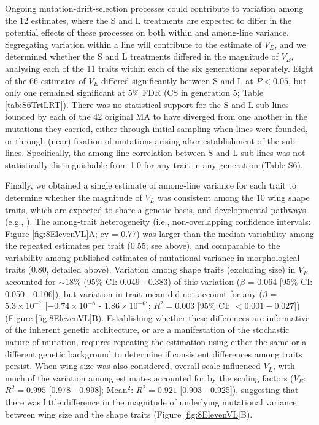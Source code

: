 Ongoing mutation-drift-selection processes could contribute to variation among the 12 estimates, where the S and L treatments are expected to differ in the potential effects of these processes on both within and among-line variance. Segregating variation within a line will contribute to the estimate of $V_E$, and we determined whether the S and L treatments differed in the magnitude of $V_E$, analysing each of the 11 traits within each of the six generations separately. Eight of the 66 estimates of $V_E$ differed significantly between S and L at $P < 0.05$, but only one remained significant at 5\% FDR (CS in generation 5; Table \ref{tab:S6TrtLRT}). There was no statistical support for the S and L sub-lines founded by each of the 42 original MA to have diverged from one another in the mutations they carried, either through initial sampling when lines were founded, or through (near) fixation of mutations arising after establishment of the sub-lines. Specifically, the among-line correlation between S and L sub-lines was not statistically distinguishable from 1.0 for any trait in any generation (Table S6). \par

Finally, we obtained a single estimate of among-line variance for each trait to determine whether the magnitude of $V_L$ was consistent among the 10 wing shape traits, which are expected to share a genetic basis, and developmental pathways (e.g., \citealp{Meze05,Neto09}). The among-trait heterogeneity (i.e., non-overlapping confidence intervals: Figure \ref{fig:8ElevenVL}A; cv = 0.77) was larger than the median variability among the repeated estimates per trait (0.55; see above), and comparable to the variability among published estimates of mutational variance in morphological traits (0.80, detailed above). Variation among shape traits (excluding size) in $V_E$ accounted for $\sim18\%$ (95\% CI: 0.049 - 0.383) of this variation ($\beta$ = 0.064 [95\% CI: 0.050 - 0.106]), but variation in trait mean did not account for any ($\beta$ = $5.3 \times 10^{-7}$ [$-0.74 \times 10^{-8}$ - $1.86 \times 10^{-6}$]; $R^2 = 0.003$ [95\% CI: $<0.001 - 0.027$]) (Figure \ref{fig:8ElevenVL}B). Establishing whether these differences are informative of the inherent genetic architecture, or are a manifestation of the stochastic nature of mutation, requires repeating the estimation using either the same or a different genetic background to determine if consistent differences among traits persist. When wing size was also considered, overall scale influenced $V_L$, with much of the variation among estimates accounted for by the scaling factors ($V_E$: $R^2 = 0.995$ [0.978 - 0.998]; Mean$^2$: $R^2 = 0.921$ [0.903 - 0.925]), suggesting that there was little difference in the magnitude of underlying mutational variance between wing size and the shape traits (Figure \ref{fig:8ElevenVL}B).\par

